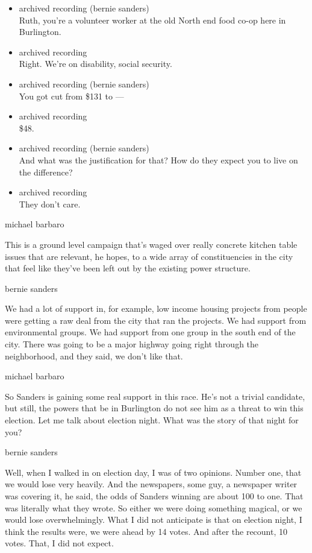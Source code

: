 \begin{itemize}
\item
  archived recording (bernie sanders)\\
  Ruth, you're a volunteer worker at the old North end food co-op here
  in Burlington.
\item
  archived recording\\
  Right. We're on disability, social security.
\item
  archived recording (bernie sanders)\\
  You got cut from \$131 to ---
\item
  archived recording\\
  \$48.
\item
  archived recording (bernie sanders)\\
  And what was the justification for that? How do they expect you to
  live on the difference?
\item
  archived recording\\
  They don't care.
\end{itemize}

michael barbaro

This is a ground level campaign that's waged over really concrete
kitchen table issues that are relevant, he hopes, to a wide array of
constituencies in the city that feel like they've been left out by the
existing power structure.

bernie sanders

We had a lot of support in, for example, low income housing projects
from people were getting a raw deal from the city that ran the projects.
We had support from environmental groups. We had support from one group
in the south end of the city. There was going to be a major highway
going right through the neighborhood, and they said, we don't like that.

michael barbaro

So Sanders is gaining some real support in this race. He's not a trivial
candidate, but still, the powers that be in Burlington do not see him as
a threat to win this election. Let me talk about election night. What
was the story of that night for you?

bernie sanders

Well, when I walked in on election day, I was of two opinions. Number
one, that we would lose very heavily. And the newspapers, some guy, a
newspaper writer was covering it, he said, the odds of Sanders winning
are about 100 to one. That was literally what they wrote. So either we
were doing something magical, or we would lose overwhelmingly. What I
did not anticipate is that on election night, I think the results were,
we were ahead by 14 votes. And after the recount, 10 votes. That, I did
not expect.

